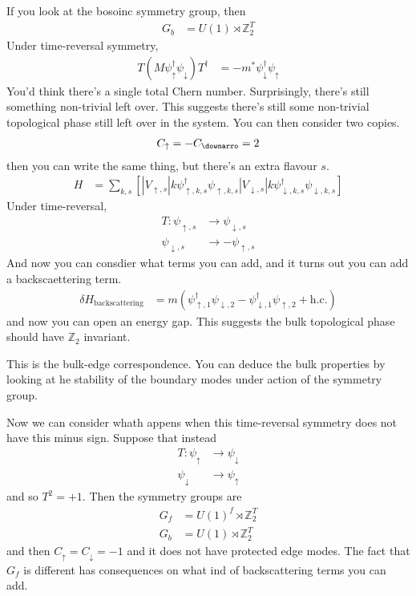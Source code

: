 If you look at the bosoinc symmetry group,
then
\begin{align}
    G_b &=
    U(1) \rtimes \mathbb{Z}_2^T
\end{align}
Under time-reversal symmetry,
\begin{align}
    T (M \psi_\uparrow^\dagger \psi_\downarrow) T^\dagger &=
    - m^* \psi_\downarrow^\dagger \psi_\uparrow
\end{align}
You'd think there's a single total Chern number.
Surprisingly,
there's still something non-trivial left over.
This suggests there's still some non-trivial topological phase still left over
in the system.
You can then consider two copies.
\begin{align}
    C_\uparrow = - C_\downarro = 2
\end{align}
then you can write the same thing,
but there's an extra flavour $s$.
\begin{align}
    H &=
    \sum_{k,s} \left[ 
    |V_{\uparrow,s}| k \psi_{\uparrow,k,s}^\dagger \psi_{\uparrow,k,s}
    |V_{\downarrow,s}| k \psi_{\downarrow,k,s}^\dagger \psi_{\downarrow,k,s}
    \right]
\end{align}
Under time-reversal,
\begin{align}
    T: \psi_{\uparrow, s} & \to \psi_{\downarrow,s}\\
    \psi_{\downarrow,s} &\to -\psi_{\uparrow,s}
\end{align}
And now you can consdier what terms you can add,
and it turns out you can add a backscaettering term.
\begin{align}
    \delta H_{\textrm{backscattering}} &=
    m\left(
    \psi_{\uparrow,1}^\dagger \psi_{\downarrow, 2}
    - \psi_{\downarrow,1}^\dagger \psi_{\uparrow, 2}
    + \mathrm{h.c.}
    \right)
\end{align}
and now you can open an energy gap.
This suggests the bulk topological phase should have
$\mathbb{Z}_2$ invariant.

This is the bulk-edge correspondence.
You can deduce the bulk properties by looking at he stability of the boundary
modes under action of the symmetry group.

Now we can consider whath appens when this time-reversal symmetry does not have
this minus sign.
Suppose that instead
\begin{align}
    T: \psi_\uparrow &\to \psi_\downarrow\\
    \psi_\downarrow & \to \psi_\uparrow
\end{align}
and so $T^2=+1$.
Then the symmetry groups are
\begin{align}
    G_f &= U(1)^f \rtimes \mathbb{Z}_2^T\\
    G_b &= U(1) \rtimes \mathbb{Z}_2^T
\end{align}
and then $C_\uparrow = C_\downarrow = -1$
and it does not have protected edge modes.
The fact that $G_f$ is different has consequences on what ind of backscattering
terms you can add.

